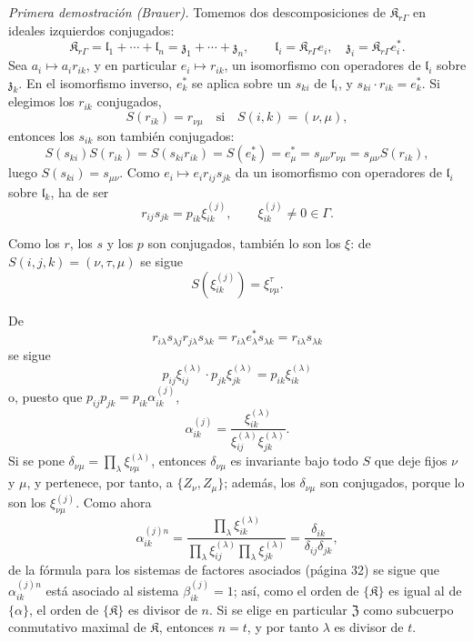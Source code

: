 \emph{Primera demostración (Brauer).} Tomemos dos descomposiciones de \(\mathfrak K_{r\Gamma}\) en ideales izquierdos conjugados:
\[
\mathfrak K_{r\Gamma}=\mathfrak l_1+\cdots+\mathfrak l_n=\mathfrak z_1+\cdots+\mathfrak z_n,\qquad
\mathfrak l_i=\mathfrak K_{r\Gamma}e_i,\quad
\mathfrak z_i=\mathfrak K_{r\Gamma}e_i^*.
\]
Sea \(a_i\mapsto a_ir_{ik}\), y en particular \(e_i\mapsto r_{ik}\), un isomorfismo con operadores de \(\mathfrak l_i\) sobre \(\mathfrak z_k\). En el isomorfismo inverso, \(e_k^*\) se aplica sobre un \(s_{ki}\) de \(\mathfrak l_i\), y \(s_{ki}\cdot r_{ik}=e_k^*\). Si elegimos los \(r_{ik}\) conjugados,
\[
S(r_{ik})=r_{\nu\mu}\quad\text{si}\quad S(i,k)=(\nu,\mu),
\]
entonces los \(s_{ik}\) son también conjugados:
\[
S(s_{ki})S(r_{ik})=S(s_{ki}r_{ik})=S(e_k^*)=e_\mu^*
=s_{\mu\nu}r_{\nu\mu}=s_{\mu\nu}S(r_{ik}),
\]
luego \(S(s_{ki})=s_{\mu\nu}\). Como \(e_i\mapsto e_ir_{ij}s_{jk}\) da un isomorfismo con operadores de \(\mathfrak l_i\) sobre \(\mathfrak l_k\), ha de ser
\[
r_{ij}s_{jk}=p_{ik}\xi_{ik}^{(j)},\qquad
\xi_{ik}^{(j)}\ne0\in\Gamma.
\]

Como los \(r\), los \(s\) y los \(p\) son conjugados, también lo son los \(\xi\): de \(S(i,j,k)=(\nu,\tau,\mu)\) se sigue
\[
S(\xi_{ik}^{(j)})=\xi_{\nu\mu}^{\tau}.
\]

De
\[
r_{i\lambda}s_{\lambda j}r_{j\lambda}s_{\lambda k}
=r_{i\lambda}e_\lambda^*s_{\lambda k}
=r_{i\lambda}s_{\lambda k}
\]
se sigue
\[
p_{ij}\xi_{ij}^{(\lambda)}\cdot p_{jk}\xi_{jk}^{(\lambda)}
=p_{ik}\xi_{ik}^{(\lambda)}
\]
o, puesto que \(p_{ij}p_{jk}=p_{ik}\alpha_{ik}^{(j)}\),
\[
\alpha_{ik}^{(j)}
=\frac{\xi_{ik}^{(\lambda)}}{\xi_{ij}^{(\lambda)}\xi_{jk}^{(\lambda)}}.
\]
Si se pone \(\delta_{\nu\mu}=\prod_{\lambda}\xi_{\nu\mu}^{(\lambda)}\), entonces \(\delta_{\nu\mu}\) es invariante bajo todo \(S\) que deje fijos \(\nu\) y \(\mu\), y pertenece, por tanto, a \(\{Z_\nu,Z_\mu\}\); además, los \(\delta_{\nu\mu}\) son conjugados, porque lo son los \(\xi_{\nu\mu}^{(j)}\). Como ahora
\[
\alpha_{ik}^{(j)n}
=\frac{\prod_{\lambda}\xi_{ik}^{(\lambda)}}
       {\prod_{\lambda}\xi_{ij}^{(\lambda)}\prod_{\lambda}\xi_{jk}^{(\lambda)}}
=\frac{\delta_{ik}}{\delta_{ij}\delta_{jk}},
\]
de la fórmula para los sistemas de factores asociados (página 32) se sigue que \(\alpha_{ik}^{(j)n}\) está asociado al sistema \(\beta_{ik}^{(j)}=1\); así, como el orden de \(\{\mathfrak K\}\) es igual al de \(\{\alpha\}\), el orden de \(\{\mathfrak K\}\) es divisor de \(n\). Si se elige en particular \(\mathfrak Z\) como subcuerpo conmutativo maximal de \(\mathfrak K\), entonces \(n=t\), y por tanto \(\lambda\) es divisor de \(t\).

